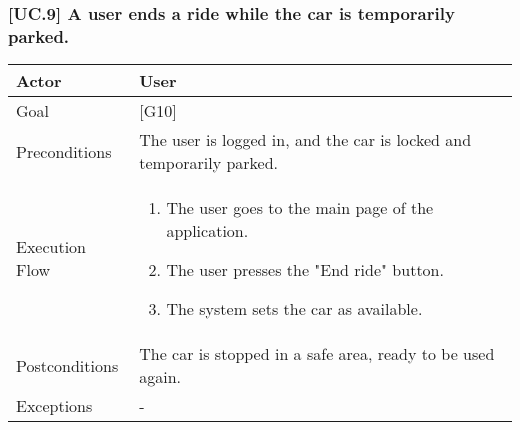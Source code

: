 \documentclass[english]{article}
\begin{document}
    \subsubsection{[UC.9] A user ends a ride while the car is temporarily parked.}
    		\begin{tabularx}{\textwidth}{  l  X  }
    			\hline
    			Actor & User\\
    			\hline
    			Goal & [G10]\\
    			\hline
    			Preconditions & The user is logged in, and the car is locked and temporarily parked.\\
    			\hline
    			Execution Flow & \begin{enumerate}
    				\item{The user goes to the main page of the application.}
    				\item{The user presses the "End ride" button.}
    				\item{The system sets the car as available.}
    				\end{enumerate}\\
    				\hline
    				Postconditions & The car is stopped in a safe area, ready to be used again.\\
    				\hline
    				Exceptions & -\\
    				\hline
    		\end{tabularx}
\end{document}

